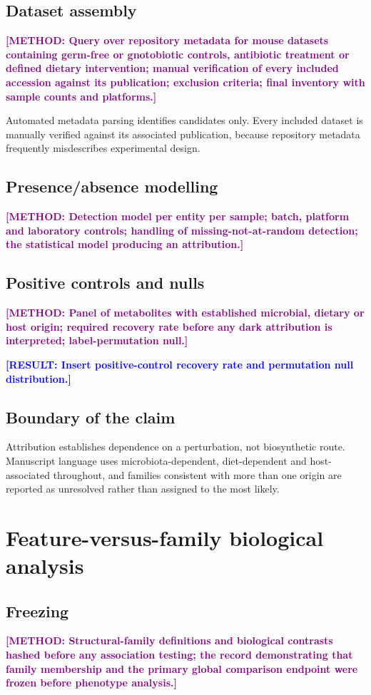 \documentclass[12pt]{article}
\newcommand{\result}[1]{\textbf{\textcolor{blue}{[RESULT: #1]}}}
\newcommand{\methodtodo}[1]{\textbf{\textcolor{purple}{[METHOD: #1]}}}
\begin{document}
\subsection{Dataset assembly}
\methodtodo{Query over repository metadata for mouse datasets containing germ-free or gnotobiotic controls, antibiotic treatment or defined dietary intervention; manual verification of every included accession against its publication; exclusion criteria; final inventory with sample counts and platforms.}

Automated metadata parsing identifies candidates only. Every included dataset is manually verified against its associated publication, because repository metadata frequently misdescribes experimental design.

\subsection{Presence/absence modelling}
\methodtodo{Detection model per entity per sample; batch, platform and laboratory controls; handling of missing-not-at-random detection; the statistical model producing an attribution.}

\subsection{Positive controls and nulls}
\methodtodo{Panel of metabolites with established microbial, dietary or host origin; required recovery rate before any dark attribution is interpreted; label-permutation null.}

\result{Insert positive-control recovery rate and permutation null distribution.}

\subsection{Boundary of the claim}
Attribution establishes dependence on a perturbation, not biosynthetic route. Manuscript language uses microbiota-dependent, diet-dependent and host-associated throughout, and families consistent with more than one origin are reported as unresolved rather than assigned to the most likely.

\section{Feature-versus-family biological analysis}

\subsection{Freezing}
\methodtodo{Structural-family definitions and biological contrasts hashed before any association testing; the record demonstrating that family membership and the primary global comparison endpoint were frozen before phenotype analysis.}
\end{document}
